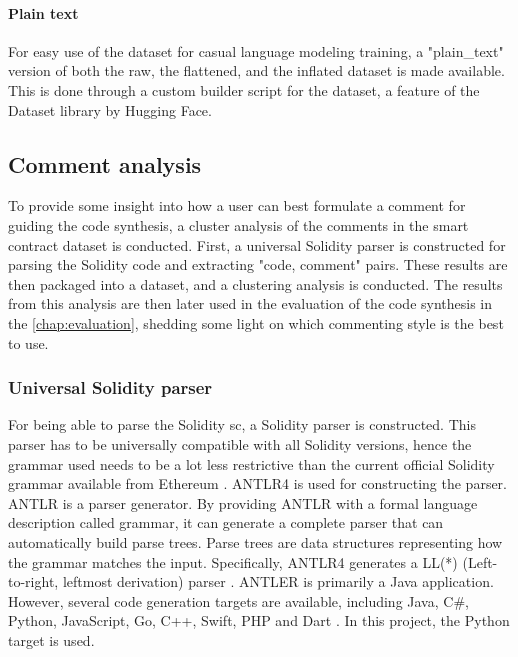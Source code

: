 \paragraph{Plain text}
\label{sec:verified-smart-contracts-plain-text}
For easy use of the dataset for casual language modeling training, a "plain\_text" version of both the raw, the flattened, and the inflated dataset is made available. This is done through a custom builder script for the dataset, a feature of the Dataset library by Hugging Face.

\FloatBarrier

\subsection{Comment analysis}
\label{sec:comment-analysis}
To provide some insight into how a user can best formulate a comment for guiding the code synthesis, a cluster analysis of the comments in the smart contract dataset is conducted. First, a universal Solidity parser is constructed for parsing the Solidity code and extracting "code, comment" pairs. These results are then packaged into a dataset, and a clustering analysis is conducted. The results from this analysis are then later used in the evaluation of the code synthesis in the \ref{chap:evaluation}, shedding some light on which commenting style is the best to use.

\subsubsection{Universal Solidity parser}
\label{sec:universal-solidity-parser}
For being able to parse the Solidity \acrshort{sc}, a Solidity parser is constructed. This parser has to be universally compatible with all Solidity versions, hence the grammar used needs to be a lot less restrictive than the current official Solidity grammar available from Ethereum \cite{soliditygrammar}. ANTLR4 \cite{antlr4} is used for constructing the parser. ANTLR is a parser generator. By providing ANTLR with a formal language description called grammar, it can generate a complete parser that can automatically build parse trees. Parse trees are data structures representing how the grammar matches the input. Specifically, ANTLR4 generates a LL(*) (Left-to-right, leftmost derivation) parser \cite{parr2011llstar}. ANTLER is primarily a Java application. However, several code generation targets are available, including Java, C\#, Python, JavaScript, Go, C++, Swift, PHP and Dart \cite{antlr-targets}. In this project, the Python target is used.

